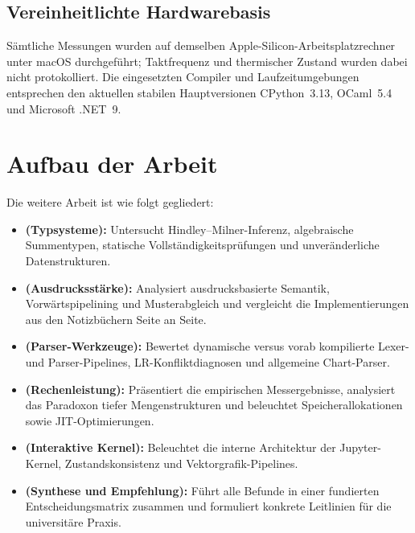 \subsection{Vereinheitlichte Hardwarebasis}
Sämtliche Messungen wurden auf demselben Apple-Silicon-Arbeitsplatzrechner unter macOS durchgeführt; Taktfrequenz und thermischer Zustand wurden dabei nicht protokolliert.
Die eingesetzten Compiler und Laufzeitumgebungen entsprechen den aktuellen stabilen Hauptversionen CPython~3.13, OCaml~5.4 und Microsoft .NET~9.

\section{Aufbau der Arbeit}
\label{sec:intro_roadmap}

Die weitere Arbeit ist wie folgt gegliedert:
\begin{itemize}
  \item \textbf{ (Typsysteme):} Untersucht Hindley--Milner-Inferenz, algebraische Summentypen, statische Vollständigkeitsprüfungen und unveränderliche Datenstrukturen.
  \item \textbf{ (Ausdrucksstärke):} Analysiert ausdrucksbasierte Semantik, Vorwärtspipelining und Musterabgleich und vergleicht die Implementierungen aus den Notizbüchern Seite an Seite.
  \item \textbf{ (Parser-Werkzeuge):} Bewertet dynamische versus vorab kompilierte Lexer- und Parser-Pipelines, LR-Konfliktdiagnosen und allgemeine Chart-Parser.
  \item \textbf{ (Rechenleistung):} Präsentiert die empirischen Messergebnisse, analysiert das Paradoxon tiefer Mengenstrukturen und beleuchtet Speicherallokationen sowie JIT-Optimierungen.
  \item \textbf{ (Interaktive Kernel):} Beleuchtet die interne Architektur der Jupyter-Kernel, Zustandskonsistenz und Vektorgrafik-Pipelines.
  \item \textbf{ (Synthese und Empfehlung):} Führt alle Befunde in einer fundierten Entscheidungsmatrix zusammen und formuliert konkrete Leitlinien für die universitäre Praxis.
\end{itemize}